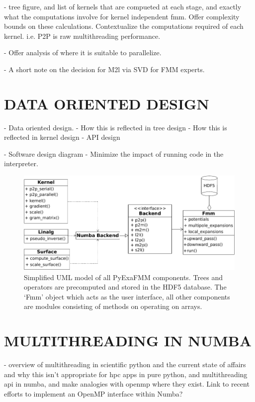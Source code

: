 \documentclass{IEEEcsmag}
\begin{document}
- tree figure, and list of kernels that are compueted at each stage, and exactly what the computations involve for kernel independent fmm. Offer complexity bounds on these calculations. Contextualize the computations required of each kernel. i.e. P2P is raw multithreading performance.

- Offer analysis of where it is suitable to parallelize.

- A short note on the decision for M2l via SVD for FMM experts.

\section{DATA ORIENTED DESIGN}

- Data oriented design.
- How this is reflected in tree design
- How this is reflected in kernel design
- API design

- Software design diagram
- Minimize the impact of running code in the interpreter.

\begin{figure}
    \centerline{\includegraphics {figures/software.pdf}}
    \caption{Simplified UML model of all PyExaFMM components. Trees and operators are precomputed and stored in the HDF5 database. The `Fmm' object which acts as the user interface, all other components are modules consisting of methods on operating on arrays.}
    \label{fig:design}
\end{figure}

\section{MULTITHREADING IN NUMBA}

- overview of multithreading in scientific python and the current state of affairs and why this isn't appropriate for hpc apps in pure python, and multithreading api in numba, and make analogies with openmp where they exist. Link to recent efforts to implement an OpenMP interface within Numba?
\end{document}
